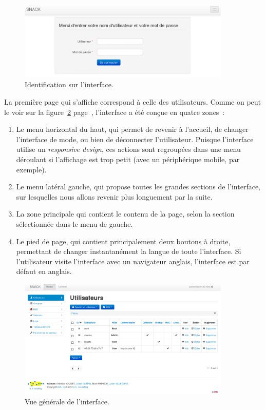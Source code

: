 \begin{figure}[!h]
	\begin{center}
	    \includegraphics[width=0.9\textwidth]{img/login.png}
	\end{center}
	\caption{Identification sur l'interface.}
	\label{login}
\end{figure}

La première page qui s'affiche correspond à celle des utilisateurs. Comme on peut le voir sur la figure~\ref{general} page~\pageref{general}, l'interface a été conçue en quatre zones~:

\begin{enumerate}
\item Le menu horizontal du haut, qui permet de revenir à l'accueil, de changer l'interface de mode, ou bien de déconnecter l'utilisateur. Puisque l'interface utilise un \emph{responsive design}, ces actions sont regroupées dans une menu déroulant si l'affichage est trop petit (avec un périphérique mobile, par exemple).
\item Le menu latéral gauche, qui propose toutes les grandes sections de l'interface, sur lesquelles nous allons revenir plus longuement par la suite.
\item La zone principale qui contient le contenu de la page, selon la section sélectionnée dans le menu de gauche.
\item Le pied de page, qui contient principalement deux boutons à droite, permettant de changer instantanément la langue de toute l'interface. Si l'utilisateur visite l'interface avec un navigateur anglais, l'interface est par défaut en anglais.
\end{enumerate}

\begin{figure}[!h]
	\begin{center}
	    \includegraphics[width=0.9\textwidth]{img/general.png}
	\end{center}
	\caption{Vue générale de l'interface.}
	\label{general}
\end{figure}

